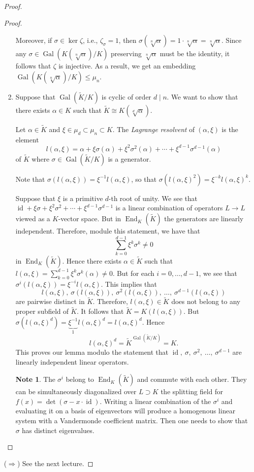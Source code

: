 \documentclass[10pt,letterpaper,cm]{nupset}
\theoremstyle{definition}
\newtheorem{note}[definition]{Note}
\theoremstyle{theorem}
\theoremstyle{remark}
\newcommand{\1}{\mathbf{1}}
\newcommand{\0}{\vec 0}
\DeclareMathOperator{\id}{id}
\DeclareMathOperator{\gal}{Gal}
\DeclareMathOperator{\ed}{End}
\begin{document}
\begin{proof}
\begin{proof}
\begin{enumerate}[label=(\alph*)]
 Moreover, if $\sigma \in \ker{\zeta}$, i.e., $\zeta_{\sigma} = 1$, then $\sigma(\sqrt[n]{\alpha}) = 1 \cdot \sqrt[n]{\alpha} = \sqrt[n]{\alpha}$. Since any $\sigma \in \gal(K(\sqrt[n]{\alpha})/K)$ preserving $\sqrt[n]{\alpha}$ must be the identity, it follows that $\zeta$ is injective. As a result, we get an embedding $\gal(K(\sqrt[n]{\alpha})/K) \leq \mu_n$.
 
\item Suppose that $\gal\left(\widetilde{K}/K\right)$ is cyclic of order $d \mid n$. We want to show that there exists $\alpha \in K$ such that $\widetilde{K} \cong K(\sqrt[d]{\alpha})$. 

Let $ \alpha \in \widetilde{K}$ and $\xi \in \mu_d \subset \mu_n \subset K$. The \textit{Lagrange resolvent} of $(\alpha, \xi)$ is the element $$ l(\alpha, \xi) =    \alpha + \xi \sigma(\alpha) + \xi^2 \sigma^2(\alpha) + \cdots + \xi^{d-1} \sigma^{d-1}(\alpha)$$ of $\widetilde{K}$ where $\sigma \in \gal\left(\widetilde{K}/K\right)$ is a generator. 

Note that $\sigma(l(\alpha, \xi)) = \xi^{-1}l(\alpha, \xi)$, so that $\sigma(l(\alpha, \xi)^2) = \xi^{-k}l(\alpha, \xi)^k$.

Suppose that $\xi$ is a primitive $d$-th root of unity.  We see that $\id + \xi \sigma + \xi^2 \sigma^2 + \cdots + \xi^{d-1} \sigma^{d-1}$ is a linear combination of operators $L \to L$ viewed as a $K$-vector space. But in $\ed_K\left(\widetilde{K}\right)$ the generators are linearly independent. Therefore, module this statement, we have that $$ \sum_{k=0}^{d-1} \xi^k \sigma^k  \ne 0 $$ in $\ed_K\left(\widetilde{K}\right)$. Hence there exists $\alpha \in \widetilde{K}$ such that $l(\alpha, \xi) = \sum_{k=0}^{d-1} \xi^k \sigma^k(\alpha) \ne 0$. But for each $i=0, \ldots, d-1$, we see that $\sigma^i(l(\alpha, \xi)) = \xi^{-i}l(\alpha, \xi)$. This implies that $$l(\alpha, \xi), \ \sigma(l(\alpha, \xi)), \ \sigma^2(l(\alpha, \xi)), \ \ldots, \ \sigma^{d-1}(l(\alpha, \xi))$$ are pairwise distinct in $\widetilde{K}$. Therefore, $l(\alpha, \xi) \in \widetilde{K}$ does not belong to any proper subfield of $\widetilde{K}$. It follows that $\widetilde{K} = K(l(\alpha, \xi))$. But $\sigma(l(\alpha, \xi)^d) = \underbrace{\xi^{-1}}_{1}l(\alpha, \xi)^d = l(\alpha, \xi)^d.$ Hence $$l(\alpha, \xi)^d = \widetilde{K}^{\gal\left(\widetilde{K}/K\right)} = K.$$This proves our lemma modulo the statement that $\id, \ \sigma, \  \sigma^2, \ \ldots , \ \sigma^{d-1}$ are linearly independent linear operators.
\begin{note}
The $\sigma^i$ belong to $\ed_K\left(\widetilde{K}\right)$ and commute with each other. They can be simultaneously diagonalized over $L \supset K$ the splitting field for $f(x) = \det(\sigma - x \cdot \id)$. Writing a linear combination of the $\sigma^i$ and evaluating it on a basis of eigenvectors will produce a homogenous linear system with a Vandermonde coefficient matrix. Then one needs to show that $\sigma$ has distinct eigenvalues. 
\end{note}
\end{enumerate}
\end{proof}
($\Longrightarrow$) See the next lecture.
\end{proof}
\end{document}
